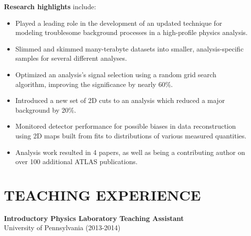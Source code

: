 \documentclass[10pt]{res}
\begin{document}
\begin{resume}

    {\bf Research highlights} include:
    \begin{itemize}
    \item Played a leading role in the development of an updated technique for modeling troublesome background processes in a high-profile physics analysis.
    \item Slimmed and skimmed many-terabyte datasets into smaller, analysis-specific samples for several different analyses.
    \item Optimized an analysis's signal selection using a random grid search algorithm, improving the significance by nearly 60\%.
    \item Introduced a new set of 2D cuts to an analysis which reduced a major background by 20\%.
    \item Monitored detector performance for possible biases in data reconstruction using 2D maps built from fits to distributions of various measured quantities.
    \item Analysis work resulted in 4 papers, as well as being a contributing author on over 100 additional ATLAS publications.
    \end{itemize}

\section{TEACHING EXPERIENCE}%
    {\bf Introductory Physics Laboratory Teaching Assistant}\\
    University of Pennsylvania (2013-2014)


\end{resume}
\end{document}

